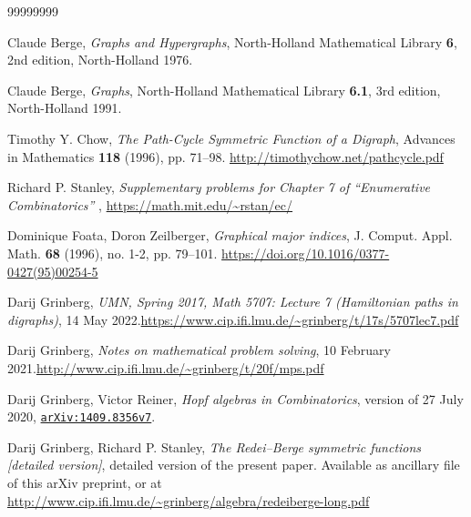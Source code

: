 \documentclass[numbers=enddot,12pt,final,onecolumn,notitlepage]{scrartcl}%
\numberwithin{exer}{section}
\theoremstyle{definition}
\newenvironment{verlong}{}{}
\newenvironment{vershort}{}{}
\begin{document}
\begin{thebibliography}{99999999}                                                                                         %


Claude Berge, \textit{Graphs and Hypergraphs},
North-Holland Mathematical Library \textbf{6}, 2nd edition, North-Holland 1976.

Claude Berge, \textit{Graphs}, North-Holland
Mathematical Library \textbf{6.1}, 3rd edition, North-Holland 1991.

Timothy Y.
Chow, \textit{The Path-Cycle Symmetric Function of a Digraph}, Advances in
Mathematics \textbf{118} (1996), pp. 71--98.
\url{http://timothychow.net/pathcycle.pdf}

Richard P. Stanley, \textit{Supplementary problems
for Chapter 7 of \textquotedblleft Enumerative Combinatorics\textquotedblright%
}, \url{https://math.mit.edu/~rstan/ec/}

%
Dominique Foata, Doron
Zeilberger, \textit{Graphical major indices}, J. Comput. Appl. Math.
\textbf{68} (1996), no. 1-2, pp. 79--101.
\url{https://doi.org/10.1016/0377-0427(95)00254-5}

Darij Grinberg, \textit{UMN, Spring 2017, Math
5707: Lecture 7 (Hamiltonian paths in digraphs)}, 14 May 2022.\newline\url{https://www.cip.ifi.lmu.de/~grinberg/t/17s/5707lec7.pdf}

Darij Grinberg, \textit{Notes on mathematical problem
solving}, 10 February 2021.\newline\url{http://www.cip.ifi.lmu.de/~grinberg/t/20f/mps.pdf}

Darij Grinberg, Victor Reiner, \textit{Hopf algebras
in Combinatorics}, version of 27 July 2020,
\href{http://www.arxiv.org/abs/1409.8356v7}{\texttt{arXiv:1409.8356v7}}.

\begin{vershort}


%
Darij
Grinberg, Richard P. Stanley, \textit{The Redei--Berge symmetric functions
[detailed version]}, detailed version of the present paper.
Available as ancillary file of this arXiv preprint, or at
\url{http://www.cip.ifi.lmu.de/~grinberg/algebra/redeiberge-long.pdf}
\end{vershort}

\begin{verlong}



\end{verlong}
\end{thebibliography}
\end{document}
